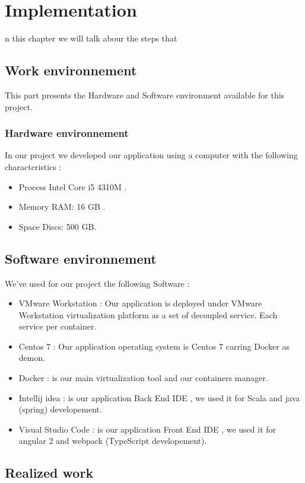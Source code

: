 %
%
\let\textcircled=\pgftextcircled
\chapter{Implementation}
\label{chap:intro}

n this chapter we will talk abour the steps that
\section{Work environnement}
\label{sec:sec01}
This part presents the Hardware and Software environment available for this project.
\subsection{Hardware environnement}
\label{sec:sec01}
In our project we developed our application using a computer with the following characteristics : 
\begin{itemize}
  \item Process Intel Core i5 4310M .
  \item Memory RAM: 16 GB .
  \item Space Discs: 500 GB.
\end{itemize}

\section{Software environnement}
\label{sec:sec01}
We've used for our project the following Software :
\begin{itemize}
  \item VMware Workstation : Our application is deployed under VMware Workstation virtualization
   platform as a set of decoupled service. Each service per container.
  \item Centos 7 : Our application operating system is Centos 7 carring Docker as demon. 
  \item Docker : is our main virtualization tool and our containers manager.
  \item Intellij idea : is our application Back End IDE , we used it for Scala and java (spring) developement.
  \item Visual Studio Code : is our application Front End IDE , we used it for angular 2 and webpack (TypeScript developement).
\end{itemize}
\section{Realized work}
\label{sec:sec01}
